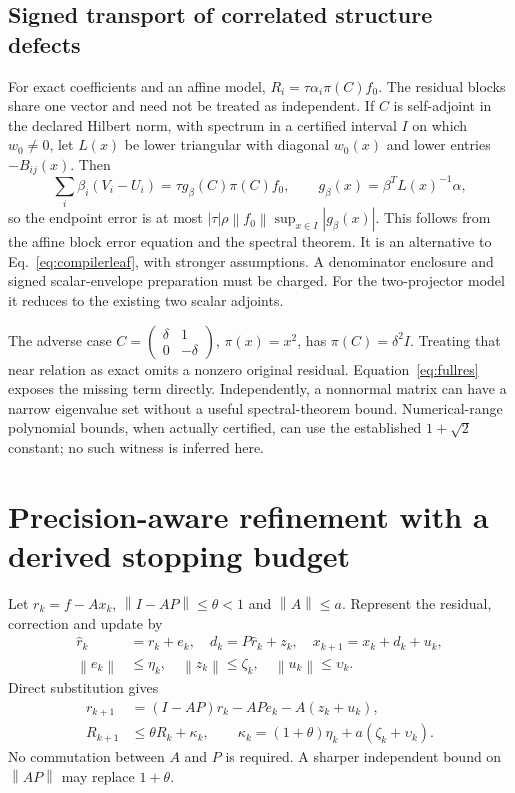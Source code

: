 \documentclass[aps,pra,reprint,onecolumn,10pt,notitlepage,nofootinbib]{revtex4-2}
\newcommand{\norm}[1]{\left\|#1\right\|}
\begin{document}
\subsection{Signed transport of correlated structure defects}

For exact coefficients and an affine model, $R_i=\tau\alpha_i\pi(C)f_0$.
The residual blocks share one vector and need not be treated as independent.
If $C$ is self-adjoint in the declared Hilbert norm, with spectrum in a
certified interval $I$ on which $w_0\ne0$, let $L(x)$ be lower triangular
with diagonal $w_0(x)$ and lower entries $-B_{ij}(x)$. Then
\begin{equation}
 \sum_i\beta_i(V_i-U_i)
 =\tau g_\beta(C)\pi(C)f_0,\qquad
 g_\beta(x)=\beta^TL(x)^{-1}\alpha,                          \label{eq:signed}
\end{equation}
so the endpoint error is at most
$|\tau|\rho\norm{f_0}\sup_{x\in I}|g_\beta(x)|$.
This follows from the affine block error equation and the spectral theorem.
It is an alternative to Eq.~\eqref{eq:compilerleaf}, with stronger assumptions.
A denominator enclosure and signed scalar-envelope preparation must be charged.
For the two-projector model it reduces to the existing two scalar adjoints.

The adverse case $C=\left(\begin{smallmatrix}\delta&1\\0&-\delta\end{smallmatrix}\right)$,
$\pi(x)=x^2$, has $\pi(C)=\delta^2I$. Treating that near relation as exact
omits a nonzero original residual. Equation~\eqref{eq:fullres} exposes the
missing term directly. Independently, a nonnormal matrix can have a narrow
eigenvalue set without a useful spectral-theorem bound. Numerical-range
polynomial bounds, when actually certified, can use the established
$1+\sqrt2$ constant\cite{crouzeix}; no such witness is inferred here.

\section{Precision-aware refinement with a derived stopping budget}

Let $r_k=f-Ax_k$, $\norm{I-AP}\le\theta<1$ and $\norm{A}\le a$.
Represent the residual, correction and update by
\begin{equation}
 \begin{aligned}
 \widehat r_k&=r_k+e_k,\quad d_k=P\widehat r_k+z_k,\quad
 x_{k+1}=x_k+d_k+u_k,\\
 \norm{e_k}&\le\eta_k,\quad\norm{z_k}\le\zeta_k,\quad
 \norm{u_k}\le\upsilon_k.
 \end{aligned}
\end{equation}
Direct substitution gives
\begin{align}
 r_{k+1}&=(I-AP)r_k-APe_k-A(z_k+u_k),\label{eq:refineidentity}\\
 R_{k+1}&\le\theta R_k+\kappa_k,\qquad
 \kappa_k=(1+\theta)\eta_k+a(\zeta_k+\upsilon_k).             \label{eq:refinebound}
\end{align}
No commutation between $A$ and $P$ is required. A sharper independent bound on
$\norm{AP}$ may replace $1+\theta$.
\end{document}
